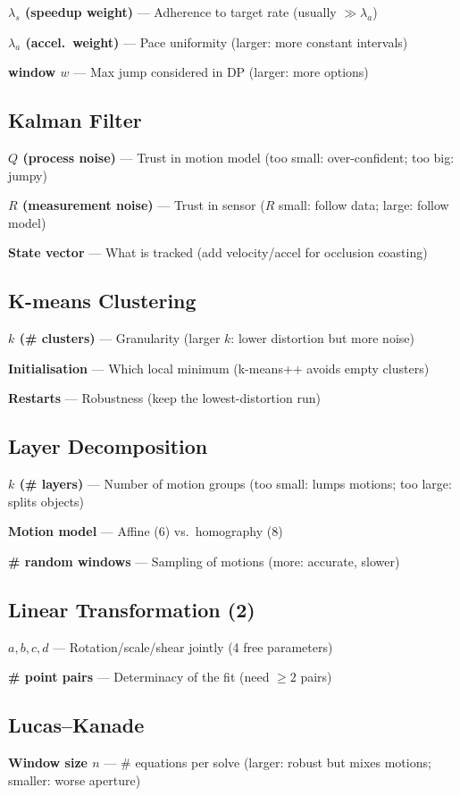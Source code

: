 \documentclass[10pt]{article}
\begin{document}
\textbf{$\lambda_s$ (speedup weight)} --- Adherence to target rate (usually $\gg\lambda_a$)

\textbf{$\lambda_a$ (accel.\ weight)} --- Pace uniformity (larger: more constant intervals)

\textbf{window $w$} --- Max jump considered in DP (larger: more options)

\subsection*{Kalman Filter}
\textbf{$Q$ (process noise)} --- Trust in motion model (too small: over-confident; too big: jumpy)

\textbf{$R$ (measurement noise)} --- Trust in sensor ($R$ small: follow data; large: follow model)

\textbf{State vector} --- What is tracked (add velocity/accel for occlusion coasting)

\subsection*{K-means Clustering}
\textbf{$k$ (\# clusters)} --- Granularity (larger $k$: lower distortion but more noise)

\textbf{Initialisation} --- Which local minimum (k-means++ avoids empty clusters)

\textbf{Restarts} --- Robustness (keep the lowest-distortion run)

\subsection*{Layer Decomposition}
\textbf{$k$ (\# layers)} --- Number of motion groups (too small: lumps motions; too large: splits objects)

\textbf{Motion model} --- Affine (6) vs.\ homography (8)

\textbf{\# random windows} --- Sampling of motions (more: accurate, slower)

\subsection*{Linear Transformation (2)}
\textbf{$a,b,c,d$} --- Rotation/scale/shear jointly (4 free parameters)

\textbf{\# point pairs} --- Determinacy of the fit (need $\ge2$ pairs)

\subsection*{Lucas--Kanade}
\textbf{Window size $n$} --- \# equations per solve (larger: robust but mixes motions; smaller: worse aperture)
\end{document}
